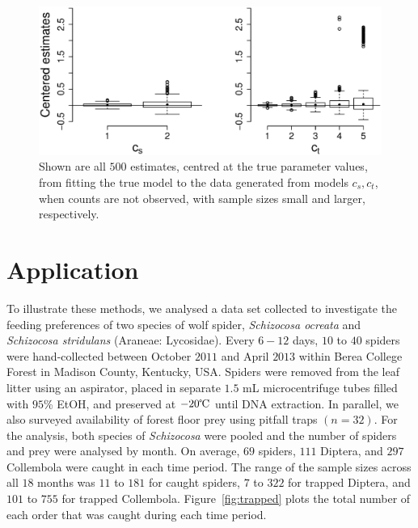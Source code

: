\documentclass[smallextended]{svjour3}
\begin{document}
\begin{figure}
  \centering
  \includegraphics[scale=0.5]{em_bp}
  \caption{Shown are all $500$ estimates, centred at the true parameter values, from fitting the true model to the data generated from models $c_s,c_t$, when counts are not observed, with sample sizes small and larger, respectively.}
  \label{fig:em_bp}
\end{figure}

\section{Application}
\label{sec:data}

To illustrate these methods, we analysed a data set collected to investigate the feeding preferences of two species of wolf spider, \textit{Schizocosa ocreata} and \textit{Schizocosa stridulans} (Araneae: Lycosidae).  Every $6-12$ days, $10$ to $40$ spiders were hand-collected between October $2011$ and April $2013$ within Berea College Forest in Madison County, Kentucky, USA.  Spiders were removed from the leaf litter using an aspirator, placed in separate $1.5$ mL microcentrifuge tubes filled with $95$\% EtOH, and preserved at $-20\celsius$ until DNA extraction.  In parallel, we also surveyed availability of forest floor prey using pitfall traps $(n = 32)$.  For the analysis, both species of \textit{Schizocosa} were pooled and the number of spiders and prey were analysed by month.  On average, $69$ spiders, $111$ Diptera, and $297$ Collembola were caught in each time period.  The range of the sample sizes across all $18$ months was $11$ to $181$ for caught spiders, $7$ to $322$ for trapped Diptera, and $101$ to $755$ for trapped Collembola.  Figure~\ref{fig:trapped} plots the total number of each order that was caught during each time period.
\end{document}
